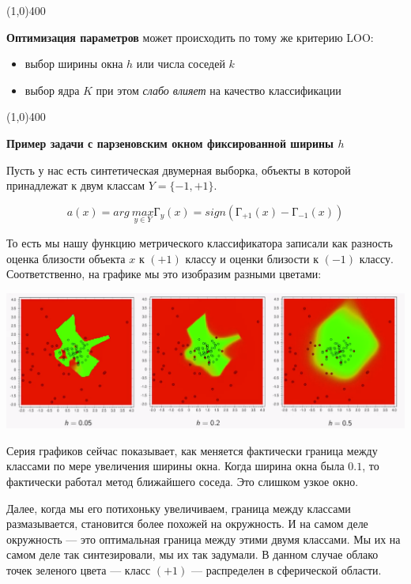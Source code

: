 \documentclass{article}
\begin{document}
\begin{center}
\line(1,0){400}
\end{center}


\textbf{Оптимизация параметров} может происходить по тому же критерию LOO:
\begin{itemize}
\item выбор ширины окна $h$ или числа соседей $k$

\item выбор ядра $K$ при этом \textit{слабо влияет} на качество классификации
\\
\end{itemize}

\begin{center}
\line(1,0){400}
\end{center}


\textbf{Пример задачи с парзеновским окном фиксированной ширины $h$}

Пусть у нас есть синтетическая двумерная выборка, объекты в которой принадлежат к двум классам $Y = \{-1, +1\}$.

$$a(x) = arg\ \underset{y \in Y}{max}\text{Г}_y(x)
= sign(\text{Г}_{+1}(x) - \text{Г}_{-1}(x))$$

То есть мы нашу функцию метрического классификатора записали как разность оценка близости объекта $x$ к $(+1)$ классу и оценки близости к $(-1)$ классу. Соответственно, на графике мы это изобразим разными цветами:

\begin{center}
    \includegraphics[scale=0.3]{images/4_3.png}
\end{center}

Серия графиков сейчас показывает, как меняется фактически граница между классами по мере увеличения ширины окна. Когда ширина окна была $0.1$, то фактически работал метод ближайшего соседа. Это слишком узкое окно. 

Далее, когда мы его потихоньку увеличиваем, граница между классами размазывается, становится более похожей на окружность. И на самом деле окружность --- это оптимальная граница между этими двумя классами. Мы их на самом деле так синтезировали, мы их так задумали. В данном случае облако точек зеленого цвета --- класс $(+1)$ --- распределен в сферической области.
\end{document}

